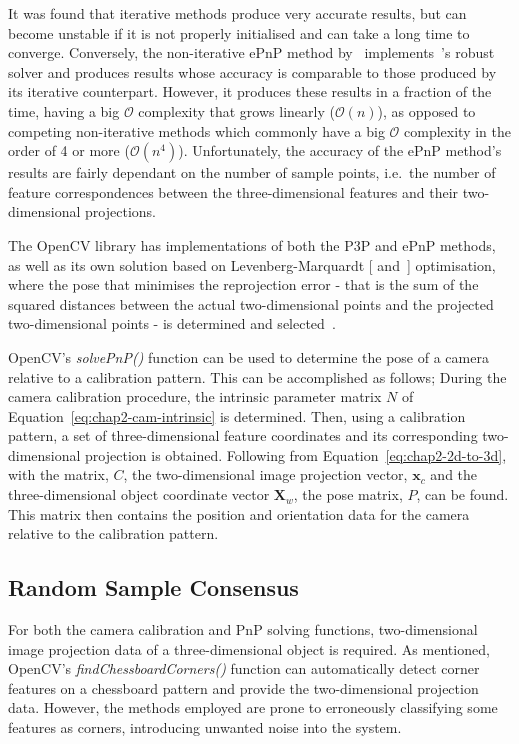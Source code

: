 It was found that iterative methods produce very accurate results, but can become unstable if it is not properly initialised and can take a long time to converge. Conversely, the non-iterative ePnP method by~\citeauthor{lepetit2009epnp} implements~\citeauthor{schweighofer2006robust}'s robust solver and produces results whose accuracy is comparable to those produced by its iterative counterpart. However, it produces these results in a fraction of the time, having a big $\mathcal{O}$ complexity that grows linearly ($\mathcal{O}(n)$), as opposed to competing non-iterative methods which commonly have a big $\mathcal{O}$ complexity in the order of 4 or more ($\mathcal{O}(n^4)$). Unfortunately, the accuracy of the ePnP method's results are fairly dependant on the number of sample points, i.e.\ the number of feature correspondences between the three-dimensional features and their two-dimensional projections. 

The OpenCV library has implementations of both the P3P and ePnP methods, as well as its own solution based on Levenberg-Marquardt [\cite{levenberg1944method} and~\cite{marquardt1963algorithm}] optimisation, where the pose that minimises the reprojection error - that is the sum of the squared distances between the actual two-dimensional points and the projected two-dimensional points - is determined and selected~\citep{opencv-levenberg}. 

OpenCV's \emph{solvePnP()} function can be used to determine the pose of a camera relative to a calibration pattern. This can be accomplished as follows; During the camera calibration procedure, the intrinsic parameter matrix $N$ of Equation~\ref{eq:chap2-cam-intrinsic} is determined. Then, using a calibration pattern, a set of three-dimensional feature coordinates and its corresponding two-dimensional projection is obtained. Following from Equation~\ref{eq:chap2-2d-to-3d}, with the matrix, $C$, the two-dimensional image projection vector, $\bm{x}_c$ and the three-dimensional object coordinate vector $\bm{X}_w$, the pose matrix, $P$, can be found. This matrix then contains the position and orientation data for the camera relative to the calibration pattern. 

\subsection{Random Sample Consensus}

For both the camera calibration and PnP solving functions, two-dimensional image projection data of a three-dimensional object is required. As mentioned, OpenCV's \emph{findChessboardCorners()} function can automatically detect corner features on a chessboard pattern and provide the two-dimensional projection data. However, the methods employed are prone to erroneously classifying some features as corners, introducing unwanted noise into the system. 

